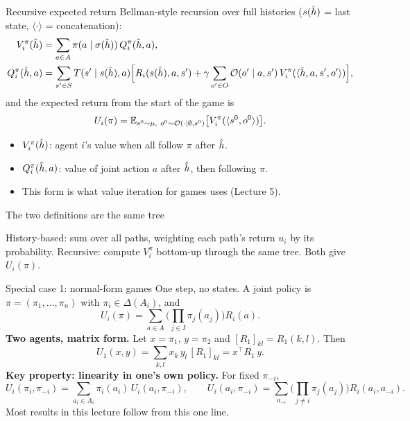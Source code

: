 \documentclass[aspectratio=169,11pt]{beamer}
\begin{document}
\begin{frame}{Recursive expected return}
  Bellman-style recursion over full histories ($s(\hat{h})$ = last state, $\langle \cdot \rangle$ = concatenation):
  \begin{align*}
    V_i^\pi(\hat{h}) &= \sum_{a \in A} \pi(a \mid \sigma(\hat{h}))\, Q_i^\pi(\hat{h}, a), \\
    Q_i^\pi(\hat{h}, a) &= \sum_{s' \in S} T(s' \mid s(\hat{h}), a) \Big[ R_i(s(\hat{h}), a, s') + \gamma \sum_{o' \in O} \mathcal{O}(o' \mid a, s')\, V_i^\pi(\langle \hat{h}, a, s', o' \rangle) \Big],
  \end{align*}
  and the expected return from the start of the game is
  \[
    U_i(\pi) = \mathbb{E}_{s^0 \sim \mu,\ o^0 \sim \mathcal{O}(\cdot \mid \emptyset, s^0)} \big[ V_i^\pi(\langle s^0, o^0 \rangle) \big].
  \]
  \begin{itemize}
    \item $V_i^\pi(\hat{h})$: agent $i$'s value when all follow $\pi$ after $\hat{h}$.
    \item $Q_i^\pi(\hat{h}, a)$: value of joint action $a$ after $\hat{h}$, then following $\pi$.
    \item This form is what value iteration for games uses (Lecture 5).
  \end{itemize}
\end{frame}

\begin{frame}{The two definitions are the same tree}
  \centering
  
  \medskip

  \small History-based: sum over all paths, weighting each path's return $u_i$ by its probability. Recursive: compute $V_i^\pi$ bottom-up through the same tree. Both give $U_i(\pi)$.
\end{frame}

\begin{frame}{Special case 1: normal-form games}
  One step, no states. A joint policy is $\pi = (\pi_1, \dots, \pi_n)$ with $\pi_i \in \Delta(A_i)$, and
  \[
    U_i(\pi) = \sum_{a \in A} \Big( \prod_{j \in I} \pi_j(a_j) \Big) R_i(a).
  \]
  \textbf{Two agents, matrix form.} Let $x = \pi_1$, $y = \pi_2$ and $[R_1]_{kl} = R_1(k, l)$. Then
  \[
    U_1(x, y) = \sum_{k, l} x_k\, y_l\, [R_1]_{kl} = x^\top R_1\, y .
  \]
  \textbf{Key property: linearity in one's own policy.} For fixed $\pi_{-i}$,
  \[
    U_i(\pi_i, \pi_{-i}) = \sum_{a_i \in A_i} \pi_i(a_i)\, U_i(a_i, \pi_{-i}),
    \qquad
    U_i(a_i, \pi_{-i}) = \sum_{a_{-i}} \Big( \prod_{j \neq i} \pi_j(a_j) \Big) R_i(a_i, a_{-i}).
  \]
  Most results in this lecture follow from this one line.
\end{frame}
\end{document}
